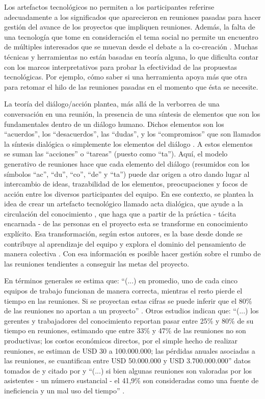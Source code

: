 Los artefactos tecnológicos no permiten a los participantes referirse adecuadamente a los significados que aparecieron en reuniones pasadas  para hacer gestión del avance de los proyectos que impliquen reuniones. Además, la falta de una tecnología que tome en consideración el tema social no permite un encuentro de múltiples interesados que se muevan desde el debate a la co-creación . Muchas técnicas y herramientas no están basadas en teoría alguna, lo que dificulta contar con los marcos interpretativos para probar la efectividad de las propuestas tecnológicas. Por ejemplo, cómo saber si una herramienta apoya más que otra para retomar el hilo de las reuniones pasadas en el momento que ésta se necesite.


La teoría del diálogo/acción plantea, más allá de la verborrea de una conversación en una reunión, la presencia de una síntesis de elementos que son los fundamentales dentro de un diálogo humano. Dichos elementos son los “acuerdos”, los “desacuerdos”, las “dudas”, y los “compromisos” que son llamados la síntesis dialógica o simplemente los elementos del diálogo . A estos elementos se suman las “acciones” o “tareas” (puesto como “ta”). Aquí, el modelo generativo de reuniones hace que cada elemento del diálogo (resumidos con los símbolos “ac”, “du”, “co”, “de” y “ta”) puede dar origen a otro dando lugar al intercambio de ideas, trazabilidad de los elementos, preocupaciones y focos de acción entre los diversos participantes del equipo. En ese contexto, se plantea la idea de crear un artefacto tecnológico llamado acta dialógica, que ayude a la circulación del conocimiento , que haga que a partir de la práctica - tácita encarnada - de las personas en el proyecto esta se transforme en conocimiento explícito. Esa transformación, según estos autores, es la base desde donde se contribuye al aprendizaje del equipo y explora el dominio del pensamiento de manera colectiva . Con esa información es posible hacer gestión sobre el rumbo de las reuniones tendientes a conseguir las metas del proyecto.

En términos generales se estima que: “(...) en promedio, uno de cada cinco equipos de trabajo funcionan de manera correcta, mientras el resto pierde el tiempo en las reuniones. Si se proyectan estas cifras se puede inferir que el 80\% de las reuniones no aportan a un proyecto” . Otros estudios indican que: “(...) los gerentes y trabajadores del conocimiento reportan pasar entre 25\% y 80\% de su tiempo en reuniones, estimando que entre 33\% y 47\% de las reuniones no son productivas; los costos económicos directos, por el simple hecho de realizar reuniones, se estiman de USD 30 a 100.000.000; las pérdidas anuales asociadas a las reuniones, se cuantifican entre USD 50.000.000 y USD 3.700.000.000” datos tomados de  y citado por  y “(...) si bien algunas reuniones son valoradas por los asistentes - un número sustancial - el 41,9\% son consideradas como una fuente de ineficiencia y un mal uso del tiempo” .

